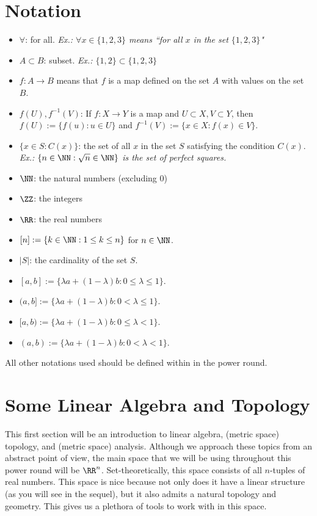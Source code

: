 \documentclass[11pt]{article}
\begin{document}
\newpage
\tableofcontents
\newpage
\pagestyle{plain}

\section*{Notation}

\begin{itemize}\itemsep0pt
    \item $\forall$: for all. \emph{Ex.: $\forall x\in\{1,2,3\}$ means ``for all $x$ in the set $\{1,2,3\}$"}
    \item $A\subset B$: subset. \emph{Ex.: $\{1,2\}\subset\{1,2,3\}$}
    \item $f : A \to B$ means that $f$ is a map defined on the set $A$ with values on the set $B$.
    \item $f(U), f^{-1}(V)$: If $f : X \to Y$ is a map and $U \subset X, V \subset Y$, then $f(U) := \{f(u) : u \in U\}$ and $f^{-1}(V) := \{x \in X : f(x) \in V\}$. 
    \item $\{x\in S : C(x)\}$: the set of all $x$ in the set $S$ satisfying the condition $C(x)$. \emph{Ex.: $\{n\in\NN : \sqrt{n}\in\NN\}$ is the set of perfect squares.}
    \item $\NN$: the natural numbers (excluding $0$)
    \item $\ZZ$: the integers
    \item $\RR$: the real numbers
    \item $[n] := \{ k \in \NN : 1 \leq k \leq n \}$ for $n \in \NN$.
    \item $|S|$: the cardinality of the set $S$.   
    \item $[a, b] := \{\lambda a + (1 - \lambda) b : 0 \leq \lambda \leq 1\}$.
    \item $(a, b] := \{\lambda a + (1 - \lambda) b : 0 < \lambda \leq 1\}$.
    \item $[a, b) := \{\lambda a + (1 - \lambda) b : 0 \leq \lambda < 1\}$.
    \item $(a, b) := \{\lambda a + (1 - \lambda ) b : 0 < \lambda < 1\}$.
\end{itemize}
All other notations used should be defined within in the power round. 

\newpage 

\section{Some Linear Algebra and Topology}

This first section will be an introduction to linear algebra, (metric space) topology, and (metric space) analysis. Although we approach these topics from an abstract point of view, the main space that we will be using throughout this power round will be $\RR^n$. Set-theoretically, this space consists of all $n$-tuples of real numbers. This space is nice because not only does it have a linear structure (as you will see in the sequel), but it also admits a natural topology and geometry. This gives us a plethora of tools to work with in this space. 
\end{document}
